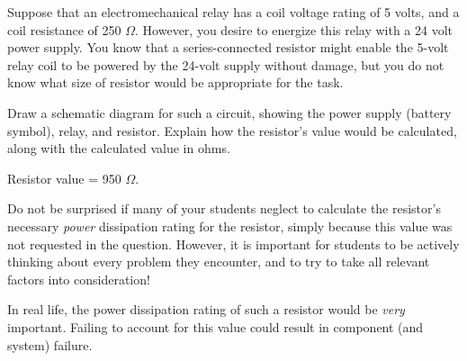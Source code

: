 

Suppose that an electromechanical relay has a coil voltage rating of 5 volts, and a coil resistance of 250 $\Omega$.  However, you desire to energize this relay with a 24 volt power supply.  You know that a series-connected resistor might enable the 5-volt relay coil to be powered by the 24-volt supply without damage, but you do not know what size of resistor would be appropriate for the task.

Draw a schematic diagram for such a circuit, showing the power supply (battery symbol), relay, and resistor.  Explain how the resistor's value would be calculated, along with the calculated value in ohms.







Resistor value = 950 $\Omega$.







Do not be surprised if many of your students neglect to calculate the resistor's necessary {\it power} dissipation rating for the resistor, simply because this value was not requested in the question.  However, it is important for students to be actively thinking about every problem they encounter, and to try to take all relevant factors into consideration!  

In real life, the power dissipation rating of such a resistor would be {\it very} important.  Failing to account for this value could result in component (and system) failure.




